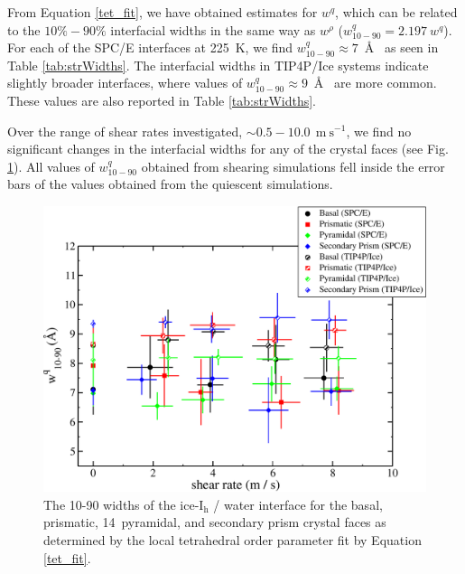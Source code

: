 From Equation \eqref{tet_fit}, we have obtained estimates for $w^{q}$,
which can be related to the $10\%-90\%$ interfacial widths in the same
way as $w^{\rho}$
($w_\mathrm{10-90}^{q} = 2.197~w^{q}$).\cite{Bryk2002,Bryk2004} For
each of the SPC/E interfaces at 225~K, we find
$w_\mathrm{10-90}^{q} \approx 7$~\AA~ as seen in Table
\ref{tab:strWidths}. The interfacial widths in TIP4P/Ice systems
indicate slightly broader interfaces, where values of
$w_\mathrm{10-90}^{q} \approx 9$~\AA~ are more common. These values
are also reported in Table \ref{tab:strWidths}. 

Over the range of shear rates investigated,
$\sim 0.5-10.0~\mathrm{~m~s}^{-1}$, we find no significant changes in
the interfacial widths for any of the crystal faces (see Fig. \ref{fig:tetByShearRate}). All values of
$w_\mathrm{10-90}^{q}$ obtained from shearing simulations fell inside the
error bars of the values obtained from the quiescent simulations.

\begin{figure}
\includegraphics[width=\linewidth]{Figures/tetByShearRate}
\caption{\label{fig:tetByShearRate}The 10-90 widths of the
  ice-I$_\mathrm{h}$ / water interface for the basal, prismatic,
  14\degree~pyramidal, and secondary prism crystal faces as determined
  by the local tetrahedral order parameter fit by
  Equation \eqref{tet_fit}.}
\end{figure}


